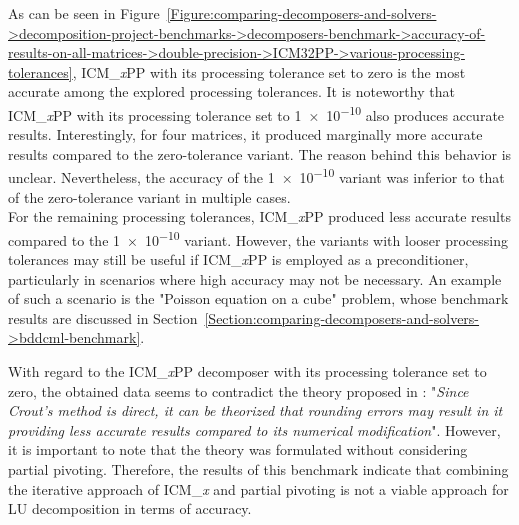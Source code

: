 \label{Text:comparing-decomposers-and-solvers->decomposition-project-benchmarks->decomposers-benchmark->accuracy-of-results-on-all-matrices->double-precision->ICM32PP->various-processing-tolerances->description-of-figure-with-accuracy-results}
As can be seen in Figure~\ref{Figure:comparing-decomposers-and-solvers->decomposition-project-benchmarks->decomposers-benchmark->accuracy-of-results-on-all-matrices->double-precision->ICM32PP->various-processing-tolerances}, ICM\_\textit{x}PP with its processing tolerance set to zero is the most accurate among the explored processing tolerances. It is noteworthy that ICM\_\textit{x}PP with its processing tolerance set to \num{1e-10} also produces accurate results. Interestingly, for four matrices, it produced marginally more accurate results compared to the zero-tolerance variant. The reason behind this behavior is unclear. Nevertheless, the accuracy of the \num{1e-10} variant was inferior to that of the zero-tolerance variant in multiple cases.\\
For the remaining processing tolerances, ICM\_\textit{x}PP produced less accurate results compared to the \num{1e-10} variant. However, the variants with looser processing tolerances may still be useful if ICM\_\textit{x}PP is employed as a preconditioner, particularly in scenarios where high accuracy may not be necessary. An example of such a scenario is the "Poisson equation on a cube" problem, whose benchmark results are discussed in Section~\ref{Section:comparing-decomposers-and-solvers->bddcml-benchmark}.

With regard to the ICM\_\textit{x}PP decomposer with its processing tolerance set to zero, the obtained data seems to contradict the theory proposed in  \cite{Cejka2022}: "\textit{Since Crout’s method is direct, it can be theorized that rounding errors may result in it providing less accurate results compared to its numerical modification}". However, it is important to note that the theory was formulated without considering partial pivoting. Therefore, the results of this benchmark indicate that combining the iterative approach of ICM\_\textit{x} and partial pivoting is not a viable approach for LU decomposition in terms of accuracy.

